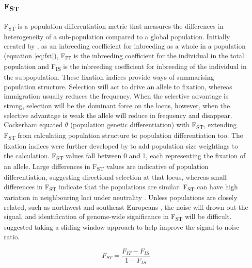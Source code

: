 \documentclass[]{report}
\begin{document}
\subsubsection{\texorpdfstring{F\textsubscript{ST}}{FST}}\label{fst}

F\textsubscript{ST} is a population differentiation metric that measures
the differences in heterogeneity of a sub-population compared to a
global population. Initially created by \citet{Wright1951}, as an
inbreeding coefficient for inbreeding as a whole in a population
(equation \eqref{eq:fst}), F\textsubscript{IT} is the inbreeding
coefficient for the individual in the total population and
F\textsubscript{IS} is the inbreeding coefficient for inbreeding of the
individual in the subpopulation. These fixation indices provide ways of
summarising population structure. Selection will act to drive an allele
to fixation, whereas immigration usually reduces the frequency. When the
selective advantage is strong, selection will be the dominant force on
the locus, however, when the selective advantage is weak the allele will
reduce in frequency and disappear. Cockerham
\citetext{\citeyear{Cockerham1969}; \citeyear{Cockerham1973}} equated
\(\theta\) (population genetic differentiation) with
F\textsubscript{ST}, extending F\textsubscript{ST} from calculating
population structure to population differentiation too. The fixation
indices were further developed by \citet{Weir1984} to add population
size weightings to the calculation. F\textsubscript{ST} values fall
between 0 and 1, each representing the fixation of an allele. Large
differences in F\textsubscript{ST} values are indicative of population
differentiation, suggesting directional selection at that locus, whereas
small differences in F\textsubscript{ST} indicate that the populations
are similar. F\textsubscript{ST} can have high variation in neighbouring
loci under neutrality \citep{Weir2005}. Unless populations are closely
related, such as northwest and southeast Europeans \citep{Price2008a},
the noise will drown out the signal, and identification of genome-wide
significance in F\textsubscript{ST} will be difficult. \citet{Weir2005}
suggested taking a sliding window approach to help improve the signal to
noise ratio.

\begin{equation} 
F_{ST} = \frac{F_{IT}{-}F_{IS}}{1{-}F_{IS}}
\label{eq:fst}
\end{equation}
\end{document}
